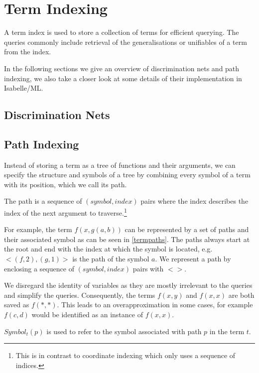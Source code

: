 \chapter{Term Indexing}
A term index is used to store a collection of terms for efficient querying. The queries commonly include retrieval of the generalisations or unifiables of a term from the index. 

In the following sections we give an overview of discrimination nets and path indexing, we also take a closer look at some details of their implementation in Isabelle/ML.

\section{Discrimination Nets}

\section{Path Indexing}
Instead of storing a term as a tree of functions and their arguments, we can specify the structure and symbols of a tree by combining every symbol of a term with its position, which we call its path.
\begin{defn}
  The path is a sequence of $(symbol, index)$ pairs where the index describes the index of the next argument to traverse.\footnote{This is in contrast to coordinate indexing which only uses a sequence of indices.}
\end{defn}
For example, the term $f(x,g(a,b))$ can be represented by a set of paths and their associated symbol as can be seen in \cref{termpaths}.
The paths always start at the root and end with the index at which the symbol is located, e.g. $<(f,2), (g,1)>$ is the path of the symbol $a$. We represent a path by enclosing a sequence of $(symbol, index)$ pairs with $<>$. 

We disregard the identity of variables as they are mostly irrelevant to the queries and simplify the queries. Consequently, the terms $f(x,y)$ and $f(x,x)$ are both saved as $f(*,*)$. This leads to an overapproximation in some cases, for example $f(c,d)$ would be identified as an instance of $f(x,x)$.

\begin{defn}
  $Symbol_{t}(p)$ is used to refer to the symbol associated with path $p$ in the term $t$.
\end{defn}

